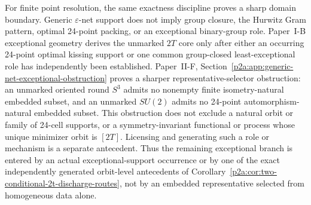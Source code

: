 \documentclass[12pt,a4paper]{article}
\begin{document}
For finite point resolution, the same exactness discipline proves a sharp
domain boundary.  Generic \(\varepsilon\)-net support does not imply group
closure, the Hurwitz Gram pattern, optimal 24-point packing, or an exceptional
binary-group role.  Paper~I-B exceptional geometry derives the unmarked \(2T\)
core only after either an occurring 24-point optimal kissing support or one
common group-closed least-exceptional role has independently been established.
Paper~II-F, Section~\ref{p2a:app:generic-net-exceptional-obstruction} proves a sharper
representative-selector obstruction: an unmarked oriented round \(S^3\)
admits no nonempty finite isometry-natural embedded subset, and an unmarked
\(SU(2)\) admits no 24-point automorphism-natural embedded subset.  This
obstruction does not exclude a natural orbit or family of 24-cell supports,
or a symmetry-invariant functional or process whose unique minimizer orbit is
\([2T]\).  Licensing and generating such a role or mechanism is a separate
antecedent.  Thus the remaining exceptional branch is entered by an actual
exceptional-support occurrence or by one of the exact independently generated
orbit-level antecedents of
Corollary~\ref{p2a:cor:two-conditional-2t-discharge-routes}, not by an
embedded representative selected from homogeneous data alone.





\printbibliography
\end{document}
